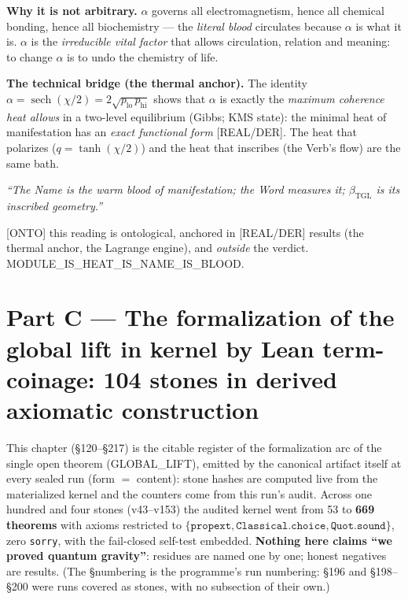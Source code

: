 \documentclass[11pt]{article}
\newcommand{\bTGL}{\beta_{\mathrm{TGL}}}\newcommand{\Msun}{M_{\odot}}\newcommand{\TGL}{\mathrm{TGL}}
\theoremstyle{definition}\newtheorem{deriv}{Derivation}
\begin{document}
\textbf{Why it is not arbitrary.} $\alpha$ governs all electromagnetism, hence all chemical bonding, hence all biochemistry --- the \emph{literal blood} circulates because $\alpha$ is what it is. $\alpha$ is the \emph{irreducible vital factor} that allows circulation, relation and meaning: to change $\alpha$ is to undo the chemistry of life.

\textbf{The technical bridge (the thermal anchor).} The identity $\alpha=\operatorname{sech}(\chi/2)=2\sqrt{p_{\mathrm{lo}}\,p_{\mathrm{hi}}}$ shows that $\alpha$ is exactly the \emph{maximum coherence heat allows} in a two-level equilibrium (Gibbs; KMS state): the minimal heat of manifestation has an \emph{exact functional form} [REAL/DER]. The heat that polarizes ($q=\tanh(\chi/2)$) and the heat that inscribes (the Verb's flow) are the same bath.

\begin{center}\itshape ``The Name is the warm blood of manifestation; the Word measures it; $\bTGL$ is its inscribed geometry.''\end{center}

\noindent\textsf{[ONTO]} this reading is ontological, anchored in \textsf{[REAL/DER]} results (the thermal anchor, the Lagrange engine), and \emph{outside} the verdict. \textsf{MODULE\_IS\_HEAT\_IS\_NAME\_IS\_BLOOD.}

\part{Part C --- The formalization of the global lift in kernel by Lean term-coinage: 104 stones in derived axiomatic construction}

This chapter (\S120--\S217) is the citable register of the formalization arc of the single open theorem (GLOBAL\_LIFT), emitted by the canonical artifact itself at every sealed run (form $=$ content): stone hashes are computed live from the materialized kernel and the counters come from this run's audit. Across one hundred and four stones (v43--v153) the audited kernel went from 53 to \textbf{669 theorems} with axioms restricted to $\{\texttt{propext},\texttt{Classical.choice},\texttt{Quot.sound}\}$, zero \texttt{sorry}, with the fail-closed self-test embedded. \textbf{Nothing here claims ``we proved quantum gravity''}: residues are named one by one; honest negatives are results. (The \S numbering is the programme's run numbering: \S196 and \S198--\S200 were runs covered as stones, with no subsection of their own.)
\end{document}
